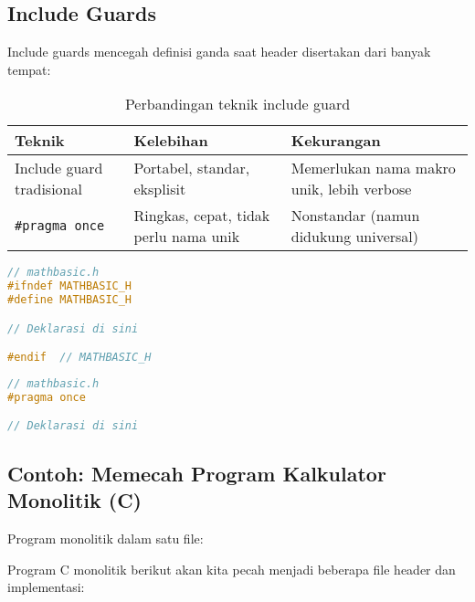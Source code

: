 \documentclass[../main.tex]{subfiles}
\begin{document}
\subsection{Include Guards}
Include guards mencegah definisi ganda saat header disertakan dari banyak tempat:

\begin{table}[H]
  \centering
  \caption{Perbandingan teknik include guard}
  \begin{tabular}{@{}p{3.8cm}p{4.8cm}p{4.4cm}@{}}
    \toprule
    \textbf{Teknik} & \textbf{Kelebihan} & \textbf{Kekurangan} \\
    \midrule
    Include guard tradisional & Portabel, standar, eksplisit & Memerlukan nama makro unik, lebih verbose \\
    \texttt{\#pragma once} & Ringkas, cepat, tidak perlu nama unik & Nonstandar (namun didukung universal) \\
    \bottomrule
  \end{tabular}
\end{table}

\begin{lstlisting}[language=C, caption={Include guard tradisional}]
// mathbasic.h
#ifndef MATHBASIC_H
#define MATHBASIC_H

// Deklarasi di sini

#endif  // MATHBASIC_H
\end{lstlisting}

\begin{lstlisting}[language=C, caption={Pragma once (alternatif modern)}]
// mathbasic.h
#pragma once

// Deklarasi di sini
\end{lstlisting}

\subsection{Contoh: Memecah Program Kalkulator Monolitik (C)}

Program monolitik dalam satu file:

Program C monolitik berikut akan kita pecah menjadi beberapa file header dan implementasi:
\end{document}
